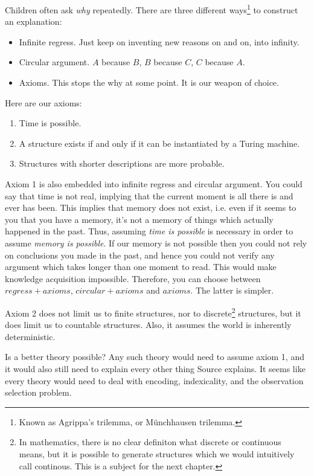 \documentclass[oneside,hidelinks]{article}
\begin{document}

Children often ask \textit{why} repeatedly.
There are three different ways\footnote{Known as Agrippa's trilemma, or Münchhausen trilemma.} to construct an explanation:
\begin{itemize}
\setlength\itemsep{0px}
\item Infinite regress. Just keep on inventing new reasons on and on, into infinity.
\item Circular argument. $A$ because $B$, $B$ because $C$, $C$ because $A$.
\item Axioms. This stops the why at some point. It is our weapon of choice.
\end{itemize}

\noindent
Here are our axioms:

\begin{enumerate}
\setlength\itemsep{0px}
\item Time is possible.
\item A structure exists if and only if it can be instantiated by a Turing machine.
\item Structures with shorter descriptions are more probable.
\end{enumerate}

Axiom 1 is also embedded into infinite regress and circular argument.
You could say that time is not real, implying that the current moment is all there is and ever has been.
This implies that memory does not exist, i.e. even if it seems to you that you have a memory, it's not a memory of things which actually happened in the past.
Thus, assuming \textit{time is possible} is necessary in order to assume \textit{memory is possible}.
If our memory is not possible then you could not rely on conclusions you made in the past, and hence you could not verify any argument which takes longer than one moment to read.
This would make knowledge acquisition impossible.
Therefore, you can choose between $regress + axioms$, $circular + axioms$ and $axioms$.
The latter is simpler.

Axiom 2 does not limit us to finite structures, nor to discrete\footnote{In mathematics, there is no clear definiton what discrete or continuous means, but it is possible to generate structures which we would intuitively call continous. This is a subject for the next chapter.} structures, but it does limit us to countable structures. Also, it assumes the world is inherently deterministic.

Is a better theory possible?
Any such theory would need to assume axiom 1, and it would also still need to explain every other thing Source explains.
It seems like every theory would need to deal with encoding, indexicality, and the observation selection problem.
\end{document}
